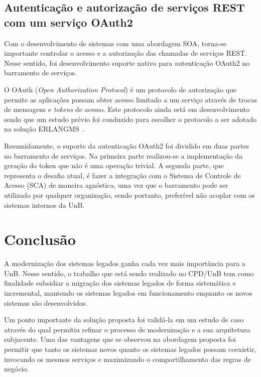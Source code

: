 \documentclass[12pt]{article}
\begin{document}
\subsection{Autenticação e autorização de serviços REST com um serviço OAuth2}\label{oauth2}

Com o desenvolvimento de sistemas com uma abordagem SOA, torna-se
importante controlar o acesso e a autorização das chamadas de serviços REST.
Nesse sentido, foi desenvolvimento suporte nativo para autenticação OAuth2
no barramento de serviços. 


O OAuth (\textit{Open Authorization Protocol}) é um protocolo de autorização 
que permite as aplicações possam obter 
acesso limitado a um serviço através de trocas de 
mensagens e \textit{tokens} de acesso. 
Este protocolo ainda está em desenvolvimento sendo que 
um estudo prévio foi conduzido para escolher o protocolo a ser adotado
na solução ERLANGMS~\cite{7521451}.


Resumidamente, o suporte da autenticação OAuth2 foi dividido em duas partes no barramento de serviços.
Na primeira parte realizou-se a implementação
da geração do token que não é uma operação trivial.
A segunda parte, que representa 
o desafio atual, é fazer a integração com o Sistema de Controle de Acesso (SCA)
de maneira agnóstica, uma vez que o barramento pode ser utilizado 
por qualquer organização, sendo portanto, preferível não acoplar com 
os sistemas internos da UnB.




\section{Conclusão}

A modernização dos sistemas legados ganha cada vez mais importância
para a UnB.
Nesse sentido, o trabalho que está sendo realizado
no CPD/UnB tem como finalidade subsidiar
a migração
dos sistemas legados de forma sistemática 
e incremental, mantendo os sistemas legados
em funcionamento enquanto os novos sistemas
são desenvolvidos.

Um ponto importante
da solução proposta foi validá-la em um estudo de caso
através do qual permitiu refinar o processo de modernização e a 
sua arquitetura subjacente.
Uma das vantagens que se observou na abordagem proposta foi permitir que tanto 
os sistemas novos quanto os sistemas legados possam coexistir, invocando os mesmos serviços e
maximizando o compartilhamento das regras de negócio.




\end{document}
